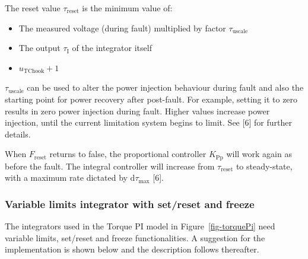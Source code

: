 \documentclass[
  a4paper,
  DIV=11,
  numbers=noendperiod]{scrartcl}
\providecommand{\tightlist}{%
  \setlength{\itemsep}{0pt}\setlength{\parskip}{0pt}}\usepackage{longtable,booktabs,array}
\begin{document}
The reset value \(\tau_\mathrm{reset}\) is the minimum value of:

\begin{itemize}
\tightlist
\item
  The measured voltage (during fault) multiplied by factor
  \(\tau_\mathrm{uscale}\)
\item
  The output \(\tau_\mathrm{I}\) of the integrator itself
\item
  \(u_\mathrm{TChook} + 1\)
\end{itemize}

\(\tau_\mathrm{uscale}\) can be used to alter the power injection
behaviour during fault and also the starting point for power recovery
after post-fault. For example, setting it to zero results in zero power
injection during fault. Higher values increase power injection, until
the current limitation system begins to limit. See {[}6{]} for further
details.

When \(F_\mathrm{reset}\) returns to false, the proportional controller
\(K_\mathrm{Pp}\) will work again as before the fault. The integral
controller will increase from \(\tau_\mathrm{reset}\) to steady-state,
with a maximum rate dictated by \(\mathrm{d}\tau_\mathrm{max}\) {[}6{]}.

\subsubsection{Variable limits integrator with set/reset and
freeze}\label{variable-limits-integrator-with-setreset-and-freeze}

The integrators used in the Torque PI model in Figure~\ref{fig-torquePi}
need variable limits, set/reset and freeze functionalities. A suggestion
for the implementation is shown below and the description follows
thereafter.
\end{document}
